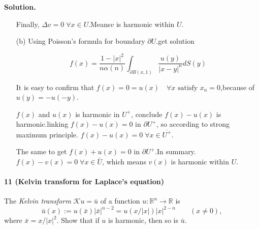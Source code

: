 \message{ !name(21935004-\unexpanded{谭焱}-homework2.tex)}\documentclass[a4paper]{book}
\newenvironment{solution}%
{\noindent\textbf{Solution.}}%
{\qedhere}
\numberwithin{equation}{chapter}
\theoremstyle{definition}
\begin{document}
\begin{multicols}{2}
\begin{solution}
\begin{itemize}
	Finally, $\Delta v = 0 \; \forall x \in U$.Means$ v $ is harmonic within $U$.
	
  \item[(b)] Using Poisson's formula for boundary $\partial U$.get solution
    
	$$ f(x) = \frac{1 - |x|^2}{n\alpha (n)}\int_{\partial B(x,1)} \frac{u(y)}{|x-y|^n} dS(y) $$
	
	It is easy to confirm that $f(x) = 0 = u(x) \quad \forall x \text{ satisfy }x_n = 0$,because of $u(y) = -u(-y)$.
	
	$f(x)$ and $u(x)$ is harmonic in $U^+$, conclude $ f(x) - u(x) $ is harmonic.linking $f(x) - u(x) = 0 \text{ in } \partial U^+$, so according to strong maximum principle. $f(x) - u(x) = 0 \; \forall x \in \overline{U^+}$.
	
	The same to get $f(x) + u(x) = 0 \text{ in } \partial U^+$.In summary. $f(x) - v(x) = 0 \; \forall x \in \bar{U}$, which means $v(x)$ is harmonic within $U$.
\end{itemize}
\end{solution}


\paragraph{11 (Kelvin transform for Laplace's equation)}
The \textit{Kelvin transform} $\mathcal{K}u = \bar{u}$ of a function $u : \mathbb{R}^n \rightarrow \mathbb{R}$ is 
\begin{equation}\label{2:11:1}
	\bar{u}(x) := u(\bar{x})|\bar{x}|^{n-2} = u(x/|x|)|x|^{2-n}  \qquad (x \neq 0),
\end{equation}
where $\bar{x} = x/|x|^2$. Show that if $u$ is harmonic, then so is $\bar{u}$.


\end{multicols}
\end{document}
